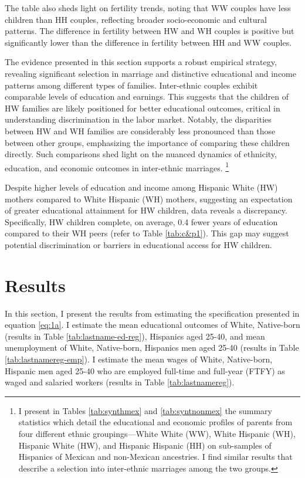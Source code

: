 The table also sheds light on fertility trends, noting that WW couples have less children than HH couples, reflecting broader socio-economic and cultural patterns. The difference in fertility between HW and WH couples is positive but significantly lower than the difference in fertility between HH and WW couples.

The evidence presented in this section supports a robust empirical strategy, revealing significant selection in marriage and distinctive educational and income patterns among different types of families. Inter-ethnic couples exhibit comparable levels of education and earnings. This suggests that the children of HW families are likely positioned for better educational outcomes, critical in understanding discrimination in the labor market. Notably, the disparities between HW and WH families are considerably less pronounced than those between other groups, emphasizing the importance of comparing these children directly. Such comparisons shed light on the nuanced dynamics of ethnicity, education, and economic outcomes in inter-ethnic marriages. \footnote{I present in Tables \ref{tab:synthmex} and \ref{tab:syntnonmex} the summary statistics which detail the educational and economic profiles of parents from four different ethnic groupings—White White (WW), White Hispanic (WH), Hispanic White (HW), and Hispanic Hispanic (HH) on sub-samples of Hispanics of Mexican and non-Mexican ancestries. I find similar results that describe a selection into inter-ethnic marriages among the two groups.} 

Despite higher levels of education and income among Hispanic White (HW) mothers compared to White Hispanic (WH) mothers, suggesting an expectation of greater educational attainment for HW children, data reveals a discrepancy. Specifically, HW children complete, on average, 0.4 fewer years of education compared to their WH peers (refer to Table \ref{tab:c&p1}). This gap may suggest potential discrimination or barriers in educational access for HW children.

\section{Results}\label{sec:results}

In this section, I present the results from estimating the specification presented in equation \ref{eq:1a}. I estimate the mean educational outcomes of White, Native-born (results in Table \ref{tab:lastname-ed-reg}), Hispanics aged 25-40, and mean unemployment of White, Native-born, Hispanics men aged 25-40 (results in Table \ref{tab:lastnamereg-emp}). I estimate the mean wages of White, Native-born, Hispanic men aged 25-40 who are employed full-time and full-year (FTFY) as waged and salaried workers (results in Table \ref{tab:lastnamereg}).

